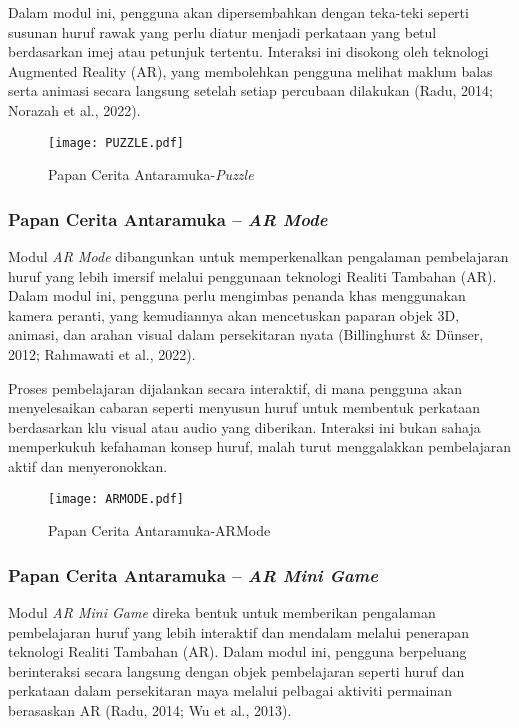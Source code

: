 Dalam modul ini, pengguna akan dipersembahkan dengan teka-teki seperti susunan huruf rawak yang perlu diatur menjadi perkataan yang betul berdasarkan imej atau petunjuk tertentu. Interaksi ini disokong oleh teknologi Augmented Reality (AR), yang membolehkan pengguna melihat maklum balas serta animasi secara langsung setelah setiap percubaan dilakukan (Radu, 2014; Norazah et al., 2022).

\begin{figure}[h]
    \centering
    \texttt{[image: PUZZLE.pdf]}
 \caption{Papan Cerita Antaramuka-\textit{Puzzle}}
    \label{Antaramuka_Puzzle}
\end{figure}
\subsubsection{Papan Cerita Antaramuka – \textit{AR Mode}}

Modul \textit{AR Mode} dibangunkan untuk memperkenalkan pengalaman pembelajaran huruf yang lebih imersif melalui penggunaan teknologi Realiti Tambahan (AR). Dalam modul ini, pengguna perlu mengimbas penanda khas menggunakan kamera peranti, yang kemudiannya akan mencetuskan paparan objek 3D, animasi, dan arahan visual dalam persekitaran nyata (Billinghurst \& Dünser, 2012; Rahmawati et al., 2022).

Proses pembelajaran dijalankan secara interaktif, di mana pengguna akan menyelesaikan cabaran seperti menyusun huruf untuk membentuk perkataan berdasarkan klu visual atau audio yang diberikan. Interaksi ini bukan sahaja memperkukuh kefahaman konsep huruf, malah turut menggalakkan pembelajaran aktif dan menyeronokkan.


\begin{figure}[h]
    \centering
    \texttt{[image: ARMODE.pdf]}
    \caption{Papan Cerita Antaramuka-ARMode}
    \label{fig:Papan_Cerita_Antaramuka_AR_Mode}
\end{figure}




\subsubsection{Papan Cerita Antaramuka – \textit{AR Mini Game}}

Modul \textit{AR Mini Game} direka bentuk untuk memberikan pengalaman pembelajaran huruf yang lebih interaktif dan mendalam melalui penerapan teknologi Realiti Tambahan (AR). Dalam modul ini, pengguna berpeluang berinteraksi secara langsung dengan objek pembelajaran seperti huruf dan perkataan dalam persekitaran maya melalui pelbagai aktiviti permainan berasaskan AR (Radu, 2014; Wu et al., 2013).

